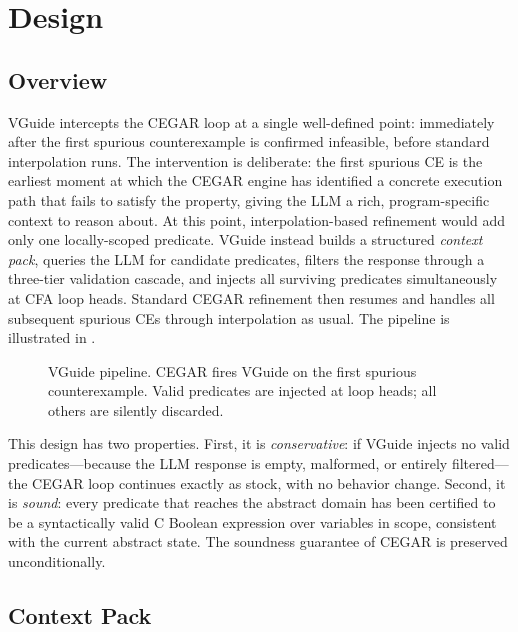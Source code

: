 \section{Design}
\label{sec:design}

\subsection{Overview}

VGuide intercepts the CEGAR loop at a single well-defined point: immediately after the
first spurious counterexample is confirmed infeasible, before standard interpolation
runs. The intervention is deliberate: the first spurious CE is the earliest moment at
which the CEGAR engine has identified a concrete execution path that fails to satisfy
the property, giving the LLM a rich, program-specific context to reason about. At this
point, interpolation-based refinement would add only one locally-scoped predicate.
VGuide instead builds a structured \emph{context pack}, queries the LLM for candidate
predicates, filters the response through a three-tier validation cascade, and injects
all surviving predicates simultaneously at CFA loop heads. Standard CEGAR refinement
then resumes and handles all subsequent spurious CEs through interpolation as usual.
The pipeline is illustrated in .

\begin{figure}[t]
  \centering
  
  \caption{VGuide pipeline. CEGAR fires VGuide on the first spurious counterexample.
           Valid predicates are injected at loop heads; all others are silently
           discarded.}
  \label{fig:pipeline}
\end{figure}

This design has two properties. First, it is \emph{conservative}: if VGuide injects
no valid predicates---because the LLM response is empty, malformed, or entirely
filtered---the CEGAR loop continues exactly as stock, with no behavior change. Second,
it is \emph{sound}: every predicate that reaches the abstract domain has been certified
to be a syntactically valid C Boolean expression over variables in scope, consistent
with the current abstract state. The soundness guarantee of CEGAR is preserved
unconditionally.

\subsection{Context Pack}


